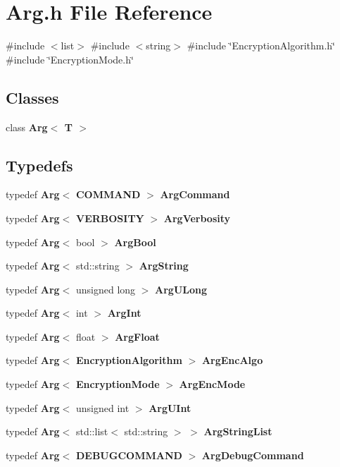 \section{Arg.\+h File Reference}
\label{Arg_8h}
{\ttfamily \#include $<$list$>$}\newline
{\ttfamily \#include $<$string$>$}\newline
{\ttfamily \#include \char`\"{}Encryption\+Algorithm.\+h\char`\"{}}\newline
{\ttfamily \#include \char`\"{}Encryption\+Mode.\+h\char`\"{}}\newline
\subsection*{Classes}
\begin{DoxyCompactItemize}
\item 
class \textbf{ Arg$<$ T $>$}
\end{DoxyCompactItemize}
\subsection*{Typedefs}
\begin{DoxyCompactItemize}
\item 
typedef \textbf{ Arg}$<$ \textbf{ C\+O\+M\+M\+A\+ND} $>$ \textbf{ Arg\+Command}
\item 
typedef \textbf{ Arg}$<$ \textbf{ V\+E\+R\+B\+O\+S\+I\+TY} $>$ \textbf{ Arg\+Verbosity}
\item 
typedef \textbf{ Arg}$<$ bool $>$ \textbf{ Arg\+Bool}
\item 
typedef \textbf{ Arg}$<$ std\+::string $>$ \textbf{ Arg\+String}
\item 
typedef \textbf{ Arg}$<$ unsigned long $>$ \textbf{ Arg\+U\+Long}
\item 
typedef \textbf{ Arg}$<$ int $>$ \textbf{ Arg\+Int}
\item 
typedef \textbf{ Arg}$<$ float $>$ \textbf{ Arg\+Float}
\item 
typedef \textbf{ Arg}$<$ \textbf{ Encryption\+Algorithm} $>$ \textbf{ Arg\+Enc\+Algo}
\item 
typedef \textbf{ Arg}$<$ \textbf{ Encryption\+Mode} $>$ \textbf{ Arg\+Enc\+Mode}
\item 
typedef \textbf{ Arg}$<$ unsigned int $>$ \textbf{ Arg\+U\+Int}
\item 
typedef \textbf{ Arg}$<$ std\+::list$<$ std\+::string $>$ $>$ \textbf{ Arg\+String\+List}
\item 
typedef \textbf{ Arg}$<$ \textbf{ D\+E\+B\+U\+G\+C\+O\+M\+M\+A\+ND} $>$ \textbf{ Arg\+Debug\+Command}
\end{DoxyCompactItemize}
